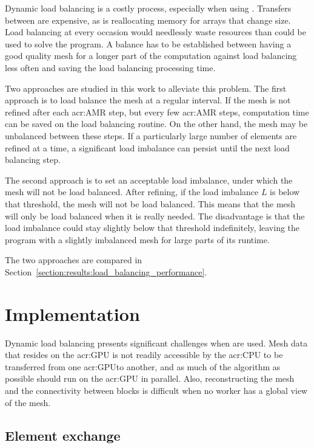 Dynamic load balancing is a costly process, especially when using . Transfers
between  are expensive, as is reallocating memory for arrays that change size.
Load balancing at every occasion would needlessly waste resources than could be used to solve the
program. A balance has to be established between having a good quality mesh for a longer part of the
computation against load balancing less often and saving the load balancing processing time.

Two approaches are studied in this work to alleviate this problem. The first approach is to load
balance the mesh at a regular interval. If the mesh is not refined after each \acrshort{acr:AMR}
step, but every few \acrshort{acr:AMR} steps, computation time can be saved on the load balancing
routine. On the other hand, the mesh may be unbalanced between these steps. If a particularly large
number of elements are refined at a time, a significant load imbalance can persist until the next
load balancing step.

The second approach is to set an acceptable load imbalance, under which the mesh will not be load
balanced. After refining, if the load imbalance \(L\) is below that threshold, the mesh will not be
load balanced. This means that the mesh will only be load balanced when it is really needed. The
disadvantage is that the load imbalance could stay slightly below that threshold indefinitely,
leaving the program with a slightly imbalanced mesh for large parts of its runtime.

The two approaches are compared in Section~\ref{section:results:load_balancing_performance}.

\section{Implementation}\label{section:load_balancing:implementation}

Dynamic load balancing presents significant challenges when  are used. Mesh data
that resides on the \acrshort{acr:GPU} is not readily accessible by the \acrshort{acr:CPU} to be
transferred from one \acrshort{acr:GPU}to another, and as much of the algorithm as possible should
run on the \acrshort{acr:GPU} in parallel. Also, reconstructing the mesh and the connectivity
between blocks is difficult when no worker has a global view of the mesh. 

\subsection{Element exchange}\label{subsection:load_balancing:implementation:element_exchange}

